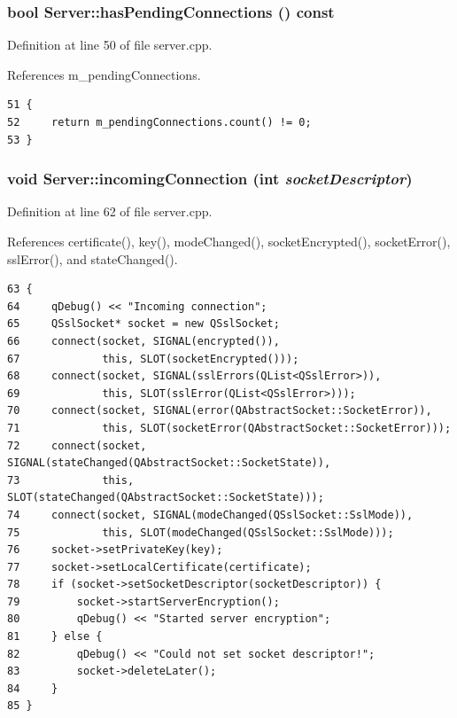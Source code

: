 \subsubsection{\setlength{\rightskip}{0pt plus 5cm}bool Server::hasPendingConnections () const\hspace{0.3cm}{\tt  [virtual]}}\label{classServer_fd20de8e190f9d837b1350ca6ffde81a}




Definition at line 50 of file server.cpp.

References m\_\-pendingConnections.

\begin{Code}\begin{verbatim}51 {
52     return m_pendingConnections.count() != 0;
53 }
\end{verbatim}
\end{Code}


\subsubsection{\setlength{\rightskip}{0pt plus 5cm}void Server::incomingConnection (int {\em socketDescriptor})\hspace{0.3cm}{\tt  [protected, virtual]}}\label{classServer_48091e8b382412a1f63f05f4cc0ad599}




Definition at line 62 of file server.cpp.

References certificate(), key(), modeChanged(), socketEncrypted(), socketError(), sslError(), and stateChanged().

\begin{Code}\begin{verbatim}63 {
64     qDebug() << "Incoming connection";
65     QSslSocket* socket = new QSslSocket;
66     connect(socket, SIGNAL(encrypted()),
67             this, SLOT(socketEncrypted()));
68     connect(socket, SIGNAL(sslErrors(QList<QSslError>)),
69             this, SLOT(sslError(QList<QSslError>)));
70     connect(socket, SIGNAL(error(QAbstractSocket::SocketError)),
71             this, SLOT(socketError(QAbstractSocket::SocketError)));
72     connect(socket, SIGNAL(stateChanged(QAbstractSocket::SocketState)),
73             this, SLOT(stateChanged(QAbstractSocket::SocketState)));
74     connect(socket, SIGNAL(modeChanged(QSslSocket::SslMode)),
75             this, SLOT(modeChanged(QSslSocket::SslMode)));
76     socket->setPrivateKey(key);
77     socket->setLocalCertificate(certificate);
78     if (socket->setSocketDescriptor(socketDescriptor)) {
79         socket->startServerEncryption();
80         qDebug() << "Started server encryption";
81     } else {
82         qDebug() << "Could not set socket descriptor!";
83         socket->deleteLater();
84     }
85 }
\end{verbatim}
\end{Code}




